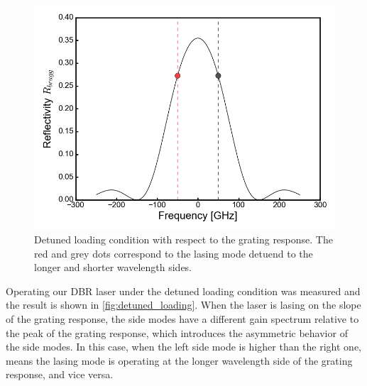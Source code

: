 \begin{figure}[ht]
    \centering
    \includegraphics[width=.65\linewidth]{figures/detuned_loading_principle.png}
    \caption{Detuned loading condition with respect to the grating response. The red and grey dots correspond to the lasing mode detuend to the longer and shorter wavelength sides.}
    \label{fig:detuned_loading_principle}
\end{figure}



Operating our DBR laser under the detuned loading condition was measured and the result is shown in \autoref{fig:detuned_loading}. When the laser is lasing on the slope of the grating response, the side modes have a different gain spectrum relative to the peak of the grating response, which introduces the asymmetric behavior of the side modes. In this case, when the left side mode is higher than the right one, means the lasing mode is operating at the longer wavelength side of the grating response, and vice versa.

